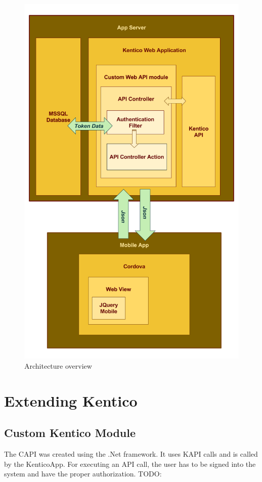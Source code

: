 \begin{figure}[ht!]
  \centering
  \includegraphics[width=\textwidth]{Images/Architecture.png}
  \caption{Architecture overview}
  \label{architectureOverview}
\end{figure}

\section{Extending Kentico} \label{implExtendingKentico}
\subsection{Custom Kentico Module}
The CAPI was created using the .Net framework. It uses KAPI calls and is called by the KenticoApp. For executing an API call, the user has to be signed into the system and have the proper authorization. 
TODO: 

